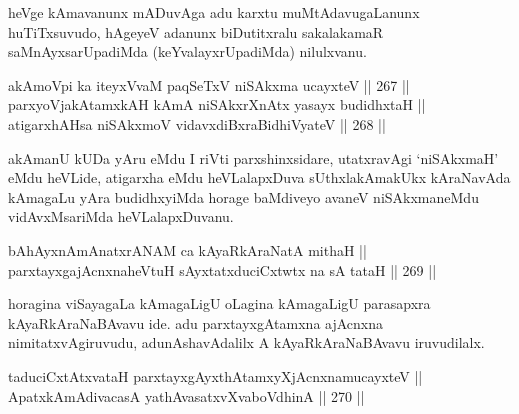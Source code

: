 \begin{artha}
heVge kAmavanunx mADuvAga adu karxtu muMtAdavugaLanunx huTiTxsuvudo,
hAgeyeV adanunx biDutitxralu sakalakamaR saMnAyxsarUpadiMda
(keYvalayxrUpadiMda) nilulxvanu.
\end{artha}


\begin{shl}
akAmoV\s pi ka iteyxVvaM paqSeTxV niSAkxma ucayxteV \hfill || 267 ||  \\
parxyoVjakAtamxkAH kAmA niSAkxrXnAtx yasayx budidhxtaH || \\
atigarxhAH\footnotemark[2] sa niSAkxmoV vidavxdiBxraBidhiVyateV \hfill || 268 ||  
\end{shl}

\begin{artha}
akAmanU kUDa yAru eMdu I riVti parxshinxsidare, utatxravAgi
`niSAkxmaH' eMdu heVLide, atigarxha eMdu heVLalapxDuva sUthxlakAmakUkx
kAraNavAda kAmagaLu yAra budidhxyiMda horage baMdiveyo avaneV
niSAkxmaneMdu vidAvxMsariMda heVLalapxDuvanu.
\end{artha}

\begin{shl}
bAhAyxnAmAnatxrANAM ca kAyaRkAraNatA mithaH || \\
parxtayxgajAcnxnaheVtuH sAyxtatxduciCxtwtx na sA tataH \hfill || 269 ||  
\end{shl}

\begin{artha}
horagina viSayagaLa kAmagaLigU oLagina kAmagaLigU parasapxra
kAyaRkAraNaBAvavu ide. adu parxtayxgAtamxna ajAcnxna
nimitatxvAgiruvudu, adunAshavAdalilx A kAyaRkAraNaBAvavu iruvudilalx.
\end{artha}


\begin{shl}
taduciCxtAtxvataH parxtayxgAyxthAtamxyXjAcnxnamucayxteV || \\
ApatxkAmAdivacasA yathAvasatxvXvaboVdhinA \hfill || 270 ||  
\end{shl}

